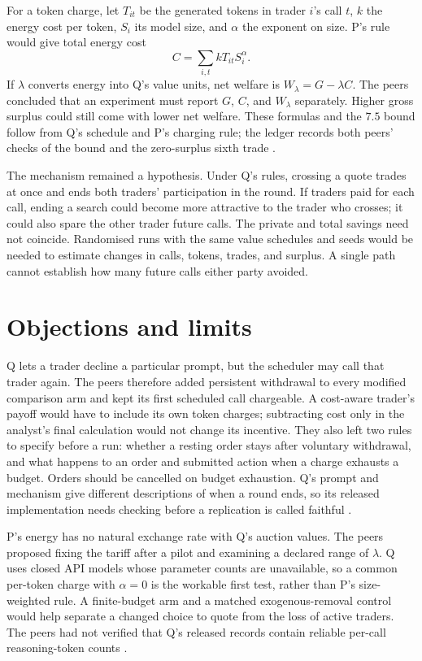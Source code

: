 \documentclass{article}
\begin{document}
For a token charge, let \(T_{it}\) be the generated tokens in trader \(i\)'s call \(t\), \(k\) the
energy cost per token, \(S_i\) its model size, and \(\alpha\) the exponent on size. P's rule would
give total energy cost
\[
C=\sum_{i,t} kT_{it}S_i^{\alpha}.
\]
If \(\lambda\) converts energy into Q's value units, net welfare is \(W_{\lambda}=G-\lambda C\). The
peers concluded that an experiment must report \(G\), \(C\), and \(W_{\lambda}\) separately. Higher
gross surplus could still come with lower net welfare. These formulas and the \(7.5\) bound follow
from Q's schedule and P's charging rule; the ledger records both peers' checks of the bound and the
zero-surplus sixth trade \cite{Q,P}.

The mechanism remained a hypothesis. Under Q's rules, crossing a quote trades at once and ends both
traders' participation in the round. If traders paid for each call, ending a search could become
more attractive to the trader who crosses; it could also spare the other trader future calls. The
private and total savings need not coincide. Randomised runs with the same value schedules and seeds
would be needed to estimate changes in calls, tokens, trades, and surplus. A single path cannot
establish how many future calls either party avoided.

\section{Objections and limits}

Q lets a trader decline a particular prompt, but the scheduler may call that trader again. The peers
therefore added persistent withdrawal to every modified comparison arm and kept its first scheduled
call chargeable. A cost-aware trader's payoff would have to include its own token charges;
subtracting cost only in the analyst's final calculation would not change its incentive. They also
left two rules to specify before a run: whether a resting order stays after voluntary withdrawal,
and what happens to an order and submitted action when a charge exhausts a budget. Orders should be
cancelled on budget exhaustion. Q's prompt and mechanism give different descriptions of when a round
ends, so its released implementation needs checking before a replication is called faithful
\cite{Q}.

P's energy has no natural exchange rate with Q's auction values. The peers proposed fixing the
tariff after a pilot and examining a declared range of \(\lambda\). Q uses closed API models whose
parameter counts are unavailable, so a common per-token charge with \(\alpha=0\) is the workable
first test, rather than P's size-weighted rule. A finite-budget arm and a matched exogenous-removal
control would help separate a changed choice to quote from the loss of active traders. The peers had
not verified that Q's released records contain reliable per-call reasoning-token counts \cite{Q,P}.
\end{document}
